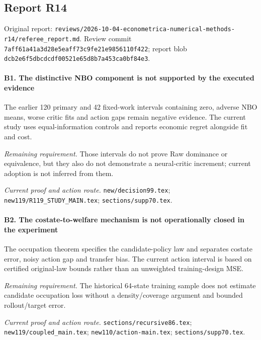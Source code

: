 \subsection{Report R14}

Original report: \nolinkurl{reviews/2026-10-04-econometrica-numerical-methods-r14/referee_report.md}. Review commit \nolinkurl{7aff61a41a3d28e5eaff73c9fe21e9856110f422}; report blob \nolinkurl{dcb2e6f5dbcdcdf00521e65d8b7a453ca0bf84e3}.

\paragraph{B1. The distinctive NBO component is not supported by the executed evidence}

The earlier 120 primary and 42 fixed-work intervals containing zero, adverse NBO means, worse critic fits and action gaps remain negative evidence. The current study uses equal-information controls and reports economic regret alongside fit and cost.

\par\emph{Remaining requirement.} Those intervals do not prove Raw dominance or equivalence, but they also do not demonstrate a neural-critic increment; current adoption is not inferred from them.

\par\emph{Current proof and action route.} \nolinkurl{new/decision99.tex}; \nolinkurl{new119/R119_STUDY_MAIN.tex}; \nolinkurl{sections/supp70.tex}.

\paragraph{B2. The costate-to-welfare mechanism is not operationally closed in the experiment}

The occupation theorem specifies the candidate-policy law and separates costate error, noisy action gap and transfer bias. The current action interval is based on certified original-law bounds rather than an unweighted training-design MSE.

\par\emph{Remaining requirement.} The historical 64-state training sample does not estimate candidate occupation loss without a density/\allowbreak{}coverage argument and bounded rollout/\allowbreak{}target error.

\par\emph{Current proof and action route.} \nolinkurl{sections/recursive86.tex}; \nolinkurl{new119/coupled_main.tex}; \nolinkurl{new110/action-main.tex}; \nolinkurl{sections/supp70.tex}.

